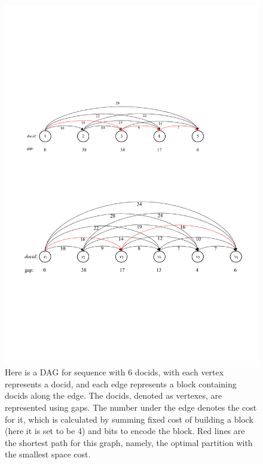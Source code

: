 \documentclass[runningheads]{comsis2}
\begin{document}
\begin{figure}
	\centering
	\includegraphics[width=0.9\linewidth]{sssp}
	\caption[sssp]{Here is a DAG for sequence with 6 docids, with each vertex represents a docid, and each edge represents a block containing docids along the edge. The docids, denoted as vertexes, are represented using gaps. The number under the edge denotes the cost for it, which is calculated by summing fixed cost of building a block (here it is set to be 4) and bits to encode the block. Red lines are the shortest path for this graph, namely, the optimal partition with the smallest space cost.}
	\label{fig:sssp}
\end{figure}
\end{document}
